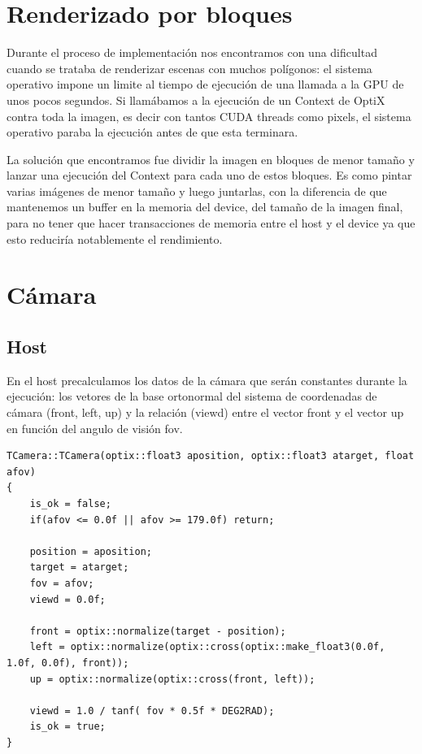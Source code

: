 \clearpage

\section{Renderizado por bloques}

Durante el proceso de implementación nos encontramos con una dificultad cuando se trataba de renderizar escenas con muchos polígonos: el sistema operativo impone un limite al tiempo de ejecución de una llamada a la GPU de unos pocos segundos. Si llamábamos a la ejecución de un Context de OptiX contra toda la imagen, es decir con tantos CUDA threads como pixels, el sistema operativo paraba la ejecución antes de que esta terminara.

\medskip

La solución que encontramos fue dividir la imagen en bloques de menor tamaño y lanzar una ejecución del Context para cada uno de estos bloques. Es como pintar varias imágenes de menor tamaño y luego juntarlas, con la diferencia de que mantenemos un buffer en la memoria del device, del tamaño de la imagen final, para no tener que hacer transacciones de memoria entre el host y el device ya que esto reduciría notablemente el rendimiento.

\clearpage

\section{Cámara}

\subsection{Host}

En el host precalculamos los datos de la cámara que serán constantes durante la ejecución: los vetores de la base ortonormal del sistema de coordenadas de cámara (front, left, up) y la relación (viewd) entre el vector front y el vector up en función del angulo de visión fov.

\begin{lstlisting}
TCamera::TCamera(optix::float3 aposition, optix::float3 atarget, float afov)
{
	is_ok = false;
	if(afov <= 0.0f || afov >= 179.0f) return;

	position = aposition;
	target = atarget;
	fov = afov;
	viewd = 0.0f;

	front = optix::normalize(target - position);
	left = optix::normalize(optix::cross(optix::make_float3(0.0f, 1.0f, 0.0f), front));
	up = optix::normalize(optix::cross(front, left));

	viewd = 1.0 / tanf( fov * 0.5f * DEG2RAD);
	is_ok = true;		
}
\end{lstlisting}

